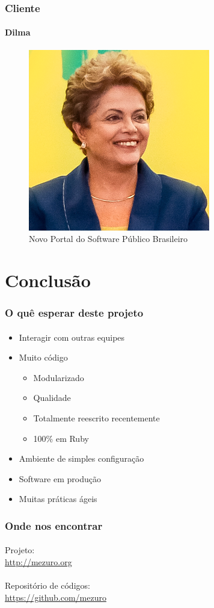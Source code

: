 \documentclass{beamer}
\begin{document}
    \begin{frame}
      \frametitle{Cliente}
      \framesubtitle{Dilma}

      \begin{figure}
        \begin{center}
          \includegraphics[height=.5\textheight]{images/delma.png}
          \caption{Novo Portal do Software Público Brasileiro}
        \end{center}
      \end{figure}
    \end{frame}

  \section{Conclusão}
    \begin{frame}
      \frametitle{O quê esperar deste projeto}
      \framesubtitle{}

      \begin{itemize}
        \item Interagir com outras equipes
        \item Muito código
          \begin{itemize}
            \item Modularizado
            \item Qualidade
            \item Totalmente reescrito recentemente
            \item 100\% em Ruby
          \end{itemize}
        \item Ambiente de simples configuração
        \item Software em produção
        \item Muitas práticas ágeis
      \end{itemize}
    \end{frame}

    \begin{frame}
      \frametitle{Onde nos encontrar}
      \framesubtitle{}
      \begin{center}
      Projeto: \\ \url{http://mezuro.org}
      \\~\\ Repositório de códigos: \\ \url{https://github.com/mezuro}
      \end{center}
    \end{frame}
\end{document}
